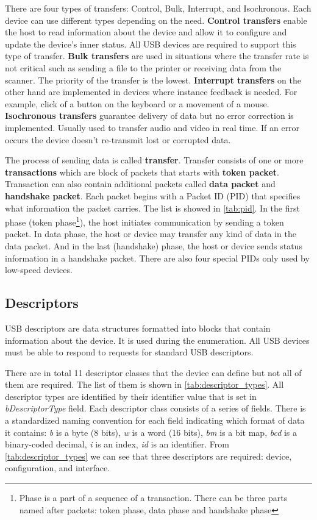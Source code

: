 There are four types of transfers: Control, Bulk, Interrupt, and Isochronous. Each device can use different types depending on the need. \textbf{Control transfers} enable the host to read information about the device and allow it to configure and update the device's inner status. All USB devices are required to support this type of transfer. \textbf{Bulk transfers} are used in situations where the transfer rate is not critical such as sending a file to the printer or receiving data from the scanner. The priority of the transfer is the lowest. \textbf{Interrupt transfers} on the other hand are implemented in devices where instance feedback is needed. For example, click of a button on the keyboard or a movement of a mouse. \textbf{Isochronous transfers} guarantee delivery of data but no error correction is implemented. Usually used to transfer audio and video in real time. If an error occurs the device doesn't re-transmit lost or corrupted data.

The process of sending data is called \textbf{transfer}. Transfer consists of one or more \textbf{transactions} which are block of packets that starts with \textbf{token packet}. Transaction can also contain additional packets called \textbf{data packet} and \textbf{handshake packet}. Each packet begins with a Packet ID (PID) that specifies what information the packet carries. The list is showed in \autoref{tab:pid}. In the first phase (token phase\footnote{Phase is a part of a sequence of a transaction. There can be three parts named after packets: token phase, data phase and handshake phase}), the host initiates communication by sending a token packet. In data phase, the host or device may transfer any kind of data in the data packet. And in the last (handshake) phase, the host or device sends status information in a handshake packet. There are also four special PIDs only used by low-speed devices.

\subsection*{Descriptors}
\label{descriptor}
USB descriptors are data structures formatted into blocks that contain information about the device. It is used during the enumeration. All USB devices must be able to respond to requests for standard USB descriptors.

There are in total 11 descriptor classes that the device can define but not all of them are required. The list of them is shown in \autoref{tab:descriptor_types}. All descriptor types are identified by their identifier value that is set in \emph{bDescriptorType} field. Each descriptor class consists of a series of fields. There is a standardized naming convention for each field indicating which format of data it contains: \emph{b} is a byte (8 bits), \emph{w} is a word (16 bits), \emph{bm} is a bit map, \emph{bcd} is a binary-coded decimal, \emph{i} is an index, \emph{id} is an identifier. From \autoref{tab:descriptor_types} we can see that three descriptors are required: device, configuration, and interface.

